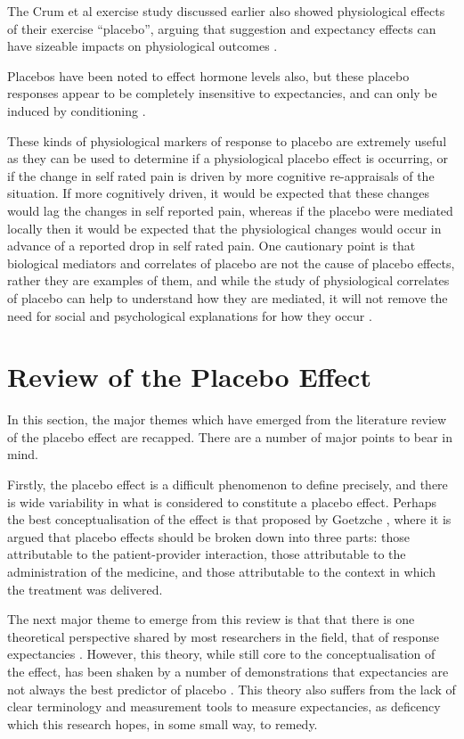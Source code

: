The Crum et al exercise study discussed earlier also showed physiological effects of their exercise ``placebo'', arguing that suggestion and expectancy effects can have sizeable impacts on physiological outcomes \cite{Crum2007}.

Placebos have been noted to effect hormone levels also, but these placebo responses appear to be completely insensitive to expectancies, and can only be induced by conditioning \cite{Benedetti2003a}. 

These kinds of physiological markers of response to placebo are extremely useful as they can be used to determine if a physiological placebo effect is occurring, or if the change in self rated pain is driven by more cognitive re-appraisals of the situation. If more cognitively driven, it would be expected that these changes would lag the changes in self reported pain, whereas if the placebo were mediated locally then it would be expected that the physiological changes would occur in advance of a reported drop in self rated pain. One cautionary point is that biological mediators and correlates of placebo are not the cause of placebo effects, rather they are examples of them, and while the study of physiological correlates of placebo can help to understand how they are mediated, it will not remove the need for social and psychological explanations for how they occur \cite{Stewart-Williams2004b}. 


\section{Review of the Placebo Effect}
\label{sec:revi-plac-effect}

In this section, the major themes which have emerged from the literature review of the placebo effect are recapped. There are a number of major points to bear in mind. 

Firstly, the placebo effect is a difficult phenomenon to define precisely, and there is wide variability in what is considered to constitute a placebo effect. Perhaps the best conceptualisation of the effect is that proposed by Goetzche \cite{Gotzsche1995}, where it is argued that placebo effects should be broken down into three parts: those attributable to the patient-provider interaction, those attributable to the administration of the medicine, and those attributable to the context in which the treatment was delivered. 

The next major theme to emerge from this review is that that there is one theoretical perspective shared by most researchers in the field, that of response expectancies \cite{Kirsch1997,Kirsch1985}. However, this theory, while still core to the conceptualisation of the effect, has been shaken by a number of demonstrations that expectancies are not always the best predictor of placebo \cite{Hyland2006,Geers2005a}. This theory also suffers from the lack of clear terminology and measurement tools to measure expectancies, as deficency which this research hopes, in some small way, to remedy. 

